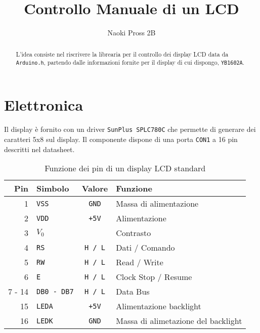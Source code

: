 \documentclass[a4paper]{article}        %
\begin{document}
	\author{Naoki Pross 2B}
	\title{Controllo Manuale di un LCD}
	\maketitle

    \begin{abstract}
        L'idea consiste nel riscrivere la librearia per il controllo dei
        display LCD data da \texttt{Arduino.h}, partendo dalle informazioni
        fornite per il display di cui dispongo, \texttt{YB1602A}.
    \end{abstract}
	
	\section{Elettronica}
    Il display \`e fornito con un driver \texttt{SunPlus SPLC780C} che
    permette di generare dei caratteri 5x8 sul display. Il componente
    dispone di una porta \texttt{CON1} a 16 pin descritti nel datasheet.
    
    \begin{table}[h]
        \centering
        \begin{tabular}{ r l c l }
            Pin & Simbolo & Valore & Funzione \\
            \hline
                 1 & \texttt{VSS}      & \texttt{GND}  & Massa di alimentazione \\
                 2 & \texttt{VDD}      & \texttt{+5V}  & Alimentazione \\
                 3 & \texttt{$V_0$}    &               & Contrasto \\
                 4 & \texttt{RS}       & \texttt{H / L}& Dati / Comando \\
                 5 & \texttt{RW}       & \texttt{H / L}& Read / Write \\
                 6 & \texttt{E}        & \texttt{H / L}& Clock Stop / Resume \\
            7 - 14 & \texttt{DB0 - DB7}& \texttt{H / L}& Data Bus \\
                15 & \texttt{LEDA}     & \texttt{+5V}  & Alimentazione backlight \\
                16 & \texttt{LEDK}     & \texttt{GND}  & Massa di alimetazione del backlight\\
            \hline
        \end{tabular}
        \caption{Funzione dei pin di un display LCD standard}
    \end{table}
\end{document}

